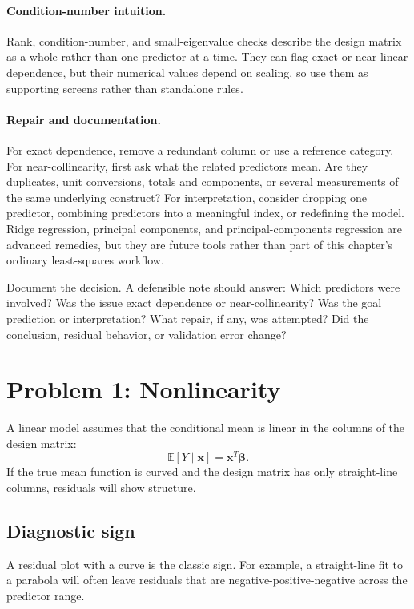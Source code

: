 {\paragraph{Condition-number intuition.}
Rank, condition-number, and small-eigenvalue checks describe the design matrix as a whole rather than one predictor at a time.  They can flag exact or near linear dependence, but their numerical values depend on scaling, so use them as supporting screens rather than standalone rules.

\paragraph{Repair and documentation.}
For exact dependence, remove a redundant column or use a reference category.  For near-collinearity, first ask what the related predictors mean.  Are they duplicates, unit conversions, totals and components, or several measurements of the same underlying construct?  For interpretation, consider dropping one predictor, combining predictors into a meaningful index, or redefining the model.  Ridge regression, principal components, and principal-components regression are advanced remedies, but they are future tools rather than part of this chapter's ordinary least-squares workflow.

Document the decision.  A defensible note should answer: Which predictors were involved? Was the issue exact dependence or near-collinearity? Was the goal prediction or interpretation? What repair, if any, was attempted? Did the conclusion, residual behavior, or validation error change?
}{}
\section{Problem 1: Nonlinearity}

A linear model assumes that the conditional mean is linear in the columns of the design matrix:
\begin{equation}
  \mathbb{E}[Y\mid \mathbf{x}]=\mathbf{x}^T\boldsymbol{\beta}.
\end{equation}
If the true mean function is curved and the design matrix has only straight-line columns, residuals will show structure.

\subsection*{Diagnostic sign}

A residual plot with a curve is the classic sign.  For example, a straight-line fit to a parabola will often leave residuals that are negative-positive-negative across the predictor range.

